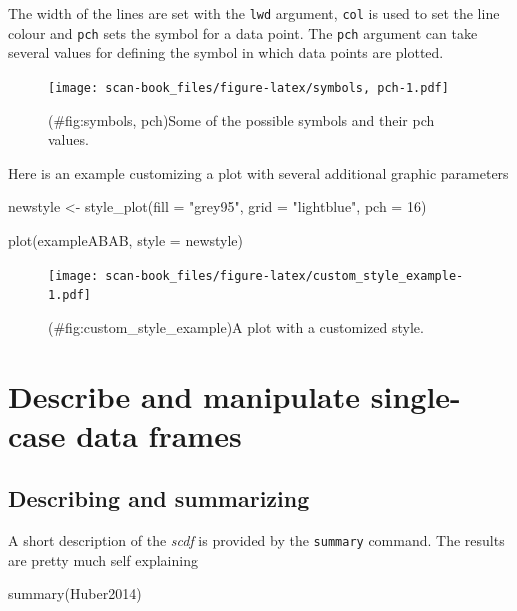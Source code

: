 \documentclass[
]{book}
\newenvironment{Shaded}{\begin{snugshade}}{\end{snugshade}}
\newcommand{\AttributeTok}[1]{\textcolor[rgb]{0.77,0.63,0.00}{#1}}
\newcommand{\DecValTok}[1]{\textcolor[rgb]{0.00,0.00,0.81}{#1}}
\newcommand{\FunctionTok}[1]{\textcolor[rgb]{0.00,0.00,0.00}{#1}}
\newcommand{\NormalTok}[1]{#1}
\newcommand{\OtherTok}[1]{\textcolor[rgb]{0.56,0.35,0.01}{#1}}
\newcommand{\StringTok}[1]{\textcolor[rgb]{0.31,0.60,0.02}{#1}}
\begin{document}
The width of the lines are set with the \texttt{lwd} argument, \texttt{col} is used to set the line colour and \texttt{pch} sets the symbol for a data point.
The \texttt{pch} argument can take several values for defining the symbol in which data points are plotted.

\begin{figure}
\centering
\texttt{[image: scan-book\_files/figure-latex/symbols, pch-1.pdf]}
\caption{(\#fig:symbols, pch)Some of the possible symbols and their pch values.}
\end{figure}

Here is an example customizing a plot with several additional graphic parameters

\begin{Shaded}
\begin{Highlighting}[]
\NormalTok{newstyle }\OtherTok{\textless{}{-}} \FunctionTok{style\_plot}\NormalTok{(}\AttributeTok{fill =} \StringTok{"grey95"}\NormalTok{, }\AttributeTok{grid =} \StringTok{"lightblue"}\NormalTok{, }\AttributeTok{pch =} \DecValTok{16}\NormalTok{)}

\FunctionTok{plot}\NormalTok{(exampleABAB, }\AttributeTok{style =}\NormalTok{ newstyle)}
\end{Highlighting}
\end{Shaded}

\begin{figure}
\centering
\texttt{[image: scan-book\_files/figure-latex/custom\_style\_example-1.pdf]}
\caption{(\#fig:custom\_style\_example)A plot with a customized style.}
\end{figure}

\hypertarget{describe-and-manipulate-single-case-data-frames}{%
\chapter{Describe and manipulate single-case data frames}\label{describe-and-manipulate-single-case-data-frames}}

\hypertarget{describing-and-summarizing}{%
\section{Describing and summarizing}\label{describing-and-summarizing}}

A short description of the \emph{scdf} is provided by the \texttt{summary} command. The results are pretty much self explaining

\begin{Shaded}
\begin{Highlighting}[]
\FunctionTok{summary}\NormalTok{(Huber2014)}
\end{Highlighting}
\end{Shaded}
\end{document}

